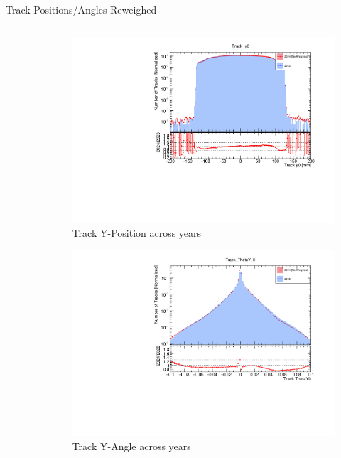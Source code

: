 \begin{frame}{Track Positions/Angles Reweighed}
\begin{columns}
\begin{column}{0.5\linewidth}
\begin{figure}
            \end{figure}
        \end{column}
        \begin{column}{0.5\linewidth}
            \vspace{-0.4cm}
            \begin{figure}
                \includegraphics[width=\linewidth]{./ReweighedPlots/Track_y0_Reweighted.pdf}
                \caption{Track Y-Position across years}
            \end{figure}
            \vspace{-0.9cm}
            \begin{figure}
                \includegraphics[width=\linewidth]{./ReweighedPlots/Track_ThetaY_0_Reweighted.pdf}
                \caption{Track Y-Angle across years}
            \end{figure}
        \end{column}
    \end{columns}
\end{frame}

